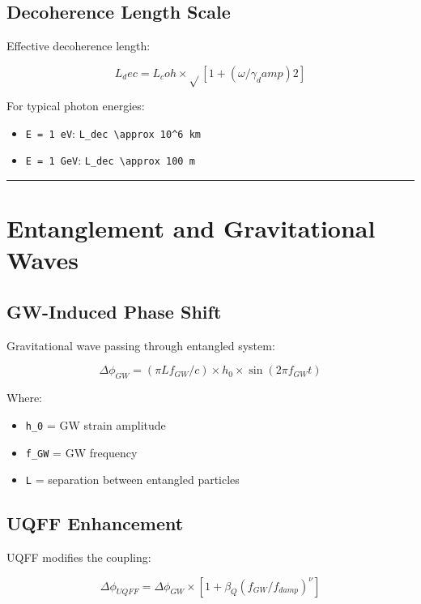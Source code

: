 \documentclass[12pt,a4paper]{article}
\begin{document}
\subsection{Decoherence Length Scale}

Effective decoherence length:

\begin{equation}
L_dec = L_coh \times \sqrt{}[1 + (\omega/\gamma_damp)2]
\end{equation}

For typical photon energies:

\begin{itemize}
  \item \texttt{E = 1 eV}: \texttt{L\_dec \textbackslash approx 10\^{}6 km}
  \item \texttt{E = 1 GeV}: \texttt{L\_dec \textbackslash approx 100 m}
\end{itemize}

\medskip\hrule\medskip

\section{Entanglement and Gravitational Waves}

\subsection{GW-Induced Phase Shift}

Gravitational wave passing through entangled system:

\begin{equation}
\Delta\phi_{GW} = (\pi L f_{GW}/c) \times h_0 \times \sin(2\pi f_{GW} t)
\end{equation}

Where:

\begin{itemize}
  \item \texttt{h\_0} = GW strain amplitude
  \item \texttt{f\_GW} = GW frequency
  \item \texttt{L} = separation between entangled particles
\end{itemize}

\subsection{UQFF Enhancement}

UQFF modifies the coupling:

\begin{equation}
\Delta\phi_{UQFF} = \Delta\phi_{GW} \times [1 + \beta_Q(f_{GW}/f_{damp})^\nu]
\end{equation}
\end{document}
